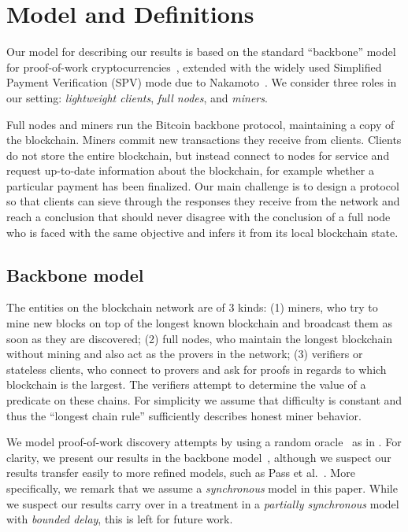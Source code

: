 \section{Model and Definitions}
\label{sec.model}
Our model for describing our results is based on the standard ``backbone'' model
for proof-of-work cryptocurrencies~\cite{backbone}, extended with the widely
used Simplified Payment Verification (SPV) mode due to Nakamoto~\cite{bitcoin}.
We consider three roles in our setting: \emph{lightweight clients},
\emph{full nodes}, and \emph{miners}.

Full nodes and miners run the Bitcoin backbone protocol, maintaining a copy of
the blockchain. Miners commit new transactions they receive from clients.
Clients do not store the entire blockchain, but instead connect to nodes for
service and request up-to-date information about the blockchain, for example
whether a particular payment has been finalized. Our main challenge is to design
a protocol so that clients can sieve through  the responses they receive from
the network and reach a conclusion that should never disagree with the
conclusion of a full  node who is faced with the same objective and infers it
from its local blockchain state.

\subsection{Backbone model}


The entities on the blockchain network are of 3 kinds: (1) miners, who try to
mine new blocks on top of the longest known blockchain and broadcast them as
soon as they are discovered; (2) full nodes, who maintain the longest blockchain
without mining and also act as the provers in the network; (3) verifiers or
stateless clients, who connect to provers and ask for proofs in regards to which
blockchain is the largest. The verifiers attempt to determine the value of a
predicate on these chains. For simplicity we assume that difficulty is constant
and thus the ``longest chain rule'' sufficiently describes honest miner
behavior.

We model proof-of-work discovery attempts by using a random oracle~\cite{RO} as
in \cite{backbone}. For clarity, we present our results in the backbone
model~\cite{backbone}, although we suspect our results transfer easily to more
refined models, such as Pass et al.~\cite{PSS}. More specifically, we remark
that we assume a \emph{synchronous} model in this paper. While we suspect our
results carry over in a treatment in a \emph{partially synchronous} model with
\emph{bounded delay}, this is left for future work.

